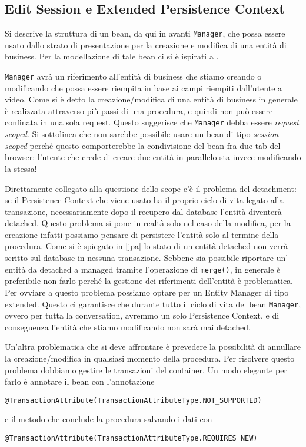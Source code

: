 \subsection{Edit Session e Extended Persistence Context}
Si descrive la struttura di un bean, da qui in avanti \texttt{Manager}, che possa essere usato dallo strato di presentazione per la creazione e modifica di una entità di business.
Per la modellazione di tale bean ci si è ispirati a \cite{jpa}.

\texttt{Manager} avrà un riferimento all'entità di business che stiamo creando o modificando che possa essere riempita in base ai campi riempiti dall'utente a video.
Come si è detto la creazione/modifica di una entità di business in generale è realizzata attraverso più passi di una procedura, e quindi non può essere confinata in una sola request. Questo suggerisce che \texttt{Manager} debba essere 
\textsl{request scoped}. Si sottolinea che non sarebbe possibile usare un bean di tipo \textsl{session scoped} perché questo comporterebbe la condivisione del bean fra due tab del browser: l'utente che crede di creare due entità in parallelo
sta invece modificando la stessa!

Direttamente collegato alla questione dello scope c'è il problema del detachment: se il Persistence Context che viene usato ha il proprio ciclo di vita legato alla transazione, necessariamente dopo il recupero dal database l'entità diventerà
detached. Questo problema si pone in realtà solo nel caso della modifica, per la creazione infatti possiamo pensare di persistere l'entità solo al termine della procedura. Come si è spiegato in \ref{jpa} lo stato di un entità detached non verrà scritto sul database in nessuna transazione. Sebbene sia possibile riportare un' entità da detached a managed tramite
l'operazione di \texttt{merge()}, in generale è preferibile non farlo perché la gestione dei riferimenti dell'entità è problematica. Per ovviare a questo problema possiamo optare per un Entity Manager di tipo extended. Questo ci garantisce
che durante tutto il ciclo di vita del bean \texttt{Manager}, ovvero per tutta la conversation, avremmo un solo Persistence Context, e di conseguenza l'entità che stiamo modificando non sarà mai detached.

Un'altra problematica che si deve affrontare è prevedere la possibilità di annullare la creazione/modifica in qualsiasi momento della procedura. Per risolvere questo problema dobbiamo gestire le transazioni del container.
Un modo elegante per farlo è annotare il bean con l'annotazione 
\begin{lstlisting} 
@TransactionAttribute(TransactionAttributeType.NOT_SUPPORTED)
\end{lstlisting}
e il metodo che conclude la procedura salvando i dati con 
\begin{lstlisting}
@TransactionAttribute(TransactionAttributeType.REQUIRES_NEW)
\end{lstlisting}



